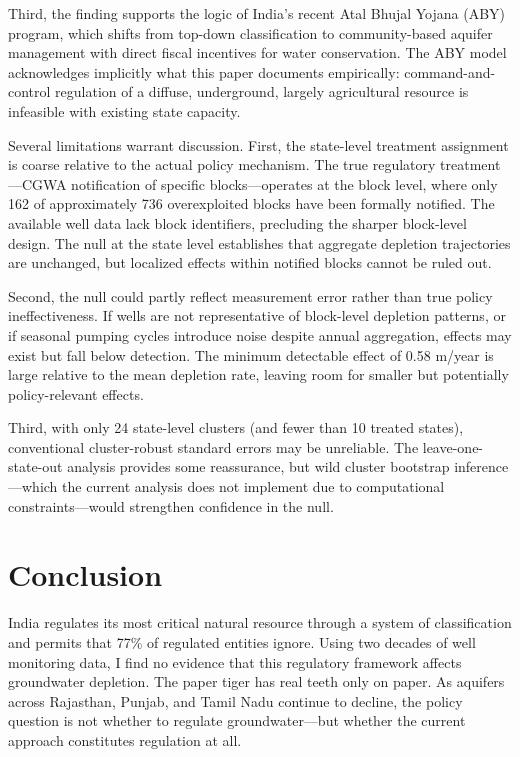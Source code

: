 \documentclass[12pt]{article}
\begin{document}
Third, the finding supports the logic of India's recent Atal Bhujal Yojana (ABY) program, which shifts from top-down classification to community-based aquifer management with direct fiscal incentives for water conservation. The ABY model acknowledges implicitly what this paper documents empirically: command-and-control regulation of a diffuse, underground, largely agricultural resource is infeasible with existing state capacity.

Several limitations warrant discussion. First, the state-level treatment assignment is coarse relative to the actual policy mechanism. The true regulatory treatment---CGWA notification of specific blocks---operates at the block level, where only 162 of approximately 736 overexploited blocks have been formally notified. The available well data lack block identifiers, precluding the sharper block-level design. The null at the state level establishes that aggregate depletion trajectories are unchanged, but localized effects within notified blocks cannot be ruled out.

Second, the null could partly reflect measurement error rather than true policy ineffectiveness. If wells are not representative of block-level depletion patterns, or if seasonal pumping cycles introduce noise despite annual aggregation, effects may exist but fall below detection. The minimum detectable effect of 0.58 m/year is large relative to the mean depletion rate, leaving room for smaller but potentially policy-relevant effects.

Third, with only 24 state-level clusters (and fewer than 10 treated states), conventional cluster-robust standard errors may be unreliable. The leave-one-state-out analysis provides some reassurance, but wild cluster bootstrap inference---which the current analysis does not implement due to computational constraints---would strengthen confidence in the null.

\section{Conclusion}

India regulates its most critical natural resource through a system of classification and permits that 77\% of regulated entities ignore. Using two decades of well monitoring data, I find no evidence that this regulatory framework affects groundwater depletion. The paper tiger has real teeth only on paper. As aquifers across Rajasthan, Punjab, and Tamil Nadu continue to decline, the policy question is not whether to regulate groundwater---but whether the current approach constitutes regulation at all.
\end{document}
